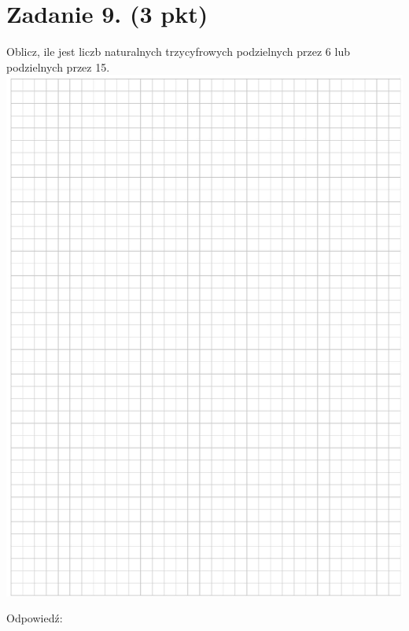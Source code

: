 \documentclass[10pt]{article}
\begin{document}
\section*{Zadanie 9. (3 pkt)}
Oblicz, ile jest liczb naturalnych trzycyfrowych podzielnych przez 6 lub podzielnych przez 15.\\
\includegraphics[max width=\textwidth, center]{2024_11_21_d9af6ed2d610d3f2d2cbg-14}

Odpowiedź:
\end{document}
